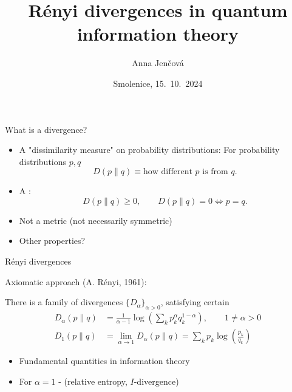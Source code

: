 \documentclass[mathserif]{beamer}
\title{R\'enyi divergences in quantum information theory}
\author{Anna Jen\v cov\'a}
\institute{Mathematical Institute, Slovak Academy
of Sciences}
\date{Smolenice, 15.~10.~2024}
\newcommand{\<}{\langle}
\renewcommand{\>}{\rangle}
\begin{document}
\begin{frame}
  \titlepage
\end{frame}

\begin{frame}{What is a divergence?}

\begin{itemize}
\item A "dissimilarity measure" on probability distributions:
\vskip 2mm
For probability distributions $p,q$
\[
D(p\|q) \equiv \text{how different }p\text{ is from }q.
\]

\item  A :  
\[
D(p\|q)\ge 0,\qquad D(p\|q)=0 \iff p=q.
\]
\vskip 2mm
\item Not a metric (not necessarily symmetric)

\medskip
\item Other properties?
\end{itemize}


\end{frame}


\begin{frame}{R\'enyi divergences}

Axiomatic approach (A. R\'enyi, 1961): 

\medskip

There is a  family of divergences $\{D_\alpha\}_{\alpha>0}$,
satisfying certain 
\begin{align*}
D_\alpha(p\|q)&=\frac1{\alpha-1}\log\left(\sum_k p_k^\alpha q_k^{1-\alpha}\right), \qquad 1\ne
\alpha>0\\
D_1(p\|q)&=\lim_{\alpha\to 1} D_\alpha(p\|q)=\sum_k p_k\log\left(\frac{p_k}{q_k}\right)
\end{align*}

\medskip


\begin{itemize}

\item Fundamental quantities in information theory

\item For $\alpha=1$ -  (relative entropy,
$I$-divergence)

\end{itemize}

\end{frame}
\end{document}
